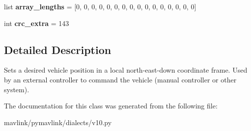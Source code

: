 \begin{DoxyCompactItemize}
list {\bfseries array\+\_\+lengths} = \mbox{[}0, 0, 0, 0, 0, 0, 0, 0, 0, 0, 0, 0, 0, 0, 0, 0\mbox{]}
\item 
\mbox{\label{classpymavlink_1_1dialects_1_1v10_1_1MAVLink__set__position__target__local__ned__message_afc4e694d94a38e77a4c4797c149bf033}} 
int {\bfseries crc\+\_\+extra} = 143
\end{DoxyCompactItemize}


\subsection{Detailed Description}
\begin{DoxyVerb}Sets a desired vehicle position in a local north-east-down
coordinate frame. Used by an external controller to command
the vehicle (manual controller or other system).
\end{DoxyVerb}
 

The documentation for this class was generated from the following file\+:\begin{DoxyCompactItemize}
\item 
mavlink/pymavlink/dialects/v10.\+py\end{DoxyCompactItemize}
